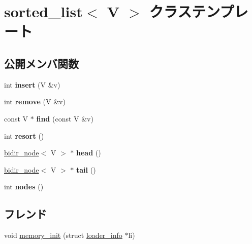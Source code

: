 \hypertarget{classsorted__list}{}\section{sorted\+\_\+list$<$ V $>$ クラステンプレート}
\label{classsorted__list}
\subsection*{公開メンバ関数}
\begin{DoxyCompactItemize}
\item 
\hypertarget{classsorted__list_a7a88d284cebe5f221de7bc45165e02e0}{}int {\bfseries insert} (V \&v)\label{classsorted__list_a7a88d284cebe5f221de7bc45165e02e0}

\item 
\hypertarget{classsorted__list_adeade10cead68bad83d1eae1a9c841aa}{}int {\bfseries remove} (V \&v)\label{classsorted__list_adeade10cead68bad83d1eae1a9c841aa}

\item 
\hypertarget{classsorted__list_a013a3060fad4b6f11507ad2d66fea59b}{}const V $\ast$ {\bfseries find} (const V \&v)\label{classsorted__list_a013a3060fad4b6f11507ad2d66fea59b}

\item 
\hypertarget{classsorted__list_a24c602fa9554ff65d4912d00ced7805b}{}int {\bfseries resort} ()\label{classsorted__list_a24c602fa9554ff65d4912d00ced7805b}

\item 
\hypertarget{classsorted__list_a31980ee808541eebcf39ac0a1e0a5773}{}\hyperlink{classbidir__node}{bidir\+\_\+node}$<$ V $>$ $\ast$ {\bfseries head} ()\label{classsorted__list_a31980ee808541eebcf39ac0a1e0a5773}

\item 
\hypertarget{classsorted__list_ac89adea8f09aa4ee809e06f90c55b2b8}{}\hyperlink{classbidir__node}{bidir\+\_\+node}$<$ V $>$ $\ast$ {\bfseries tail} ()\label{classsorted__list_ac89adea8f09aa4ee809e06f90c55b2b8}

\item 
\hypertarget{classsorted__list_a87bcb37ce7df9c4477eb1509601a8fea}{}int {\bfseries nodes} ()\label{classsorted__list_a87bcb37ce7df9c4477eb1509601a8fea}

\end{DoxyCompactItemize}
\subsection*{フレンド}
\begin{DoxyCompactItemize}
\item 
void \hyperlink{classsorted__list_a8840f01b46a3b9c43a461591a579c1bd}{memory\+\_\+init} (struct \hyperlink{structloader__info}{loader\+\_\+info} $\ast$li)
\end{DoxyCompactItemize}


